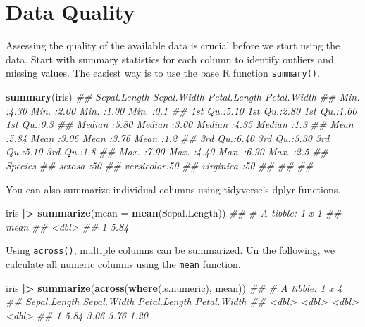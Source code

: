 \documentclass[
  notitlepage]{book}
\newenvironment{Shaded}{\begin{snugshade}}{\end{snugshade}}
\newcommand{\CommentTok}[1]{\textcolor[rgb]{0.56,0.35,0.01}{\textit{#1}}}
\newcommand{\DataTypeTok}[1]{\textcolor[rgb]{0.13,0.29,0.53}{#1}}
\newcommand{\ErrorTok}[1]{\textcolor[rgb]{0.64,0.00,0.00}{\textbf{#1}}}
\newcommand{\KeywordTok}[1]{\textcolor[rgb]{0.13,0.29,0.53}{\textbf{#1}}}
\newcommand{\NormalTok}[1]{#1}
\newcommand{\OperatorTok}[1]{\textcolor[rgb]{0.81,0.36,0.00}{\textbf{#1}}}
\newcommand{\StringTok}[1]{\textcolor[rgb]{0.31,0.60,0.02}{#1}}
\begin{document}
\hypertarget{data-quality}{%
\section{Data Quality}\label{data-quality}}

Assessing the quality of the available data is crucial before we start
using the data. Start with summary statistics for each column to
identify outliers and missing values. The easiest way is to use the base R
function \texttt{summary()}.

\begin{Shaded}
\begin{Highlighting}[]
\KeywordTok{summary}\NormalTok{(iris)}
\CommentTok{\#\#   Sepal.Length   Sepal.Width    Petal.Length   Petal.Width }
\CommentTok{\#\#  Min.   :4.30   Min.   :2.00   Min.   :1.00   Min.   :0.1  }
\CommentTok{\#\#  1st Qu.:5.10   1st Qu.:2.80   1st Qu.:1.60   1st Qu.:0.3  }
\CommentTok{\#\#  Median :5.80   Median :3.00   Median :4.35   Median :1.3  }
\CommentTok{\#\#  Mean   :5.84   Mean   :3.06   Mean   :3.76   Mean   :1.2  }
\CommentTok{\#\#  3rd Qu.:6.40   3rd Qu.:3.30   3rd Qu.:5.10   3rd Qu.:1.8  }
\CommentTok{\#\#  Max.   :7.90   Max.   :4.40   Max.   :6.90   Max.   :2.5  }
\CommentTok{\#\#        Species  }
\CommentTok{\#\#  setosa    :50  }
\CommentTok{\#\#  versicolor:50  }
\CommentTok{\#\#  virginica :50  }
\CommentTok{\#\#                 }
\CommentTok{\#\#                 }
\CommentTok{\#\# }
\end{Highlighting}
\end{Shaded}

You can also summarize
individual columns using tidyverse's dplyr functions.

\begin{Shaded}
\begin{Highlighting}[]
\NormalTok{iris }\OperatorTok{|}\ErrorTok{\textgreater{}}\StringTok{ }
\StringTok{  }\KeywordTok{summarize}\NormalTok{(}\DataTypeTok{mean =} \KeywordTok{mean}\NormalTok{(Sepal.Length))}
\CommentTok{\#\# \# A tibble: 1 x 1}
\CommentTok{\#\#    mean}
\CommentTok{\#\#   \textless{}dbl\textgreater{}}
\CommentTok{\#\# 1  5.84}
\end{Highlighting}
\end{Shaded}

Using \texttt{across()}, multiple columns can be summarized. Un the following,
we calculate all numeric columns using the \texttt{mean} function.

\begin{Shaded}
\begin{Highlighting}[]
\NormalTok{iris }\OperatorTok{|}\ErrorTok{\textgreater{}}\StringTok{ }
\StringTok{  }\KeywordTok{summarize}\NormalTok{(}\KeywordTok{across}\NormalTok{(}\KeywordTok{where}\NormalTok{(is.numeric), mean))}
\CommentTok{\#\# \# A tibble: 1 x 4}
\CommentTok{\#\#   Sepal.Length Sepal.Width Petal.Length Petal.Width}
\CommentTok{\#\#          \textless{}dbl\textgreater{}       \textless{}dbl\textgreater{}        \textless{}dbl\textgreater{}       \textless{}dbl\textgreater{}}
\CommentTok{\#\# 1         5.84        3.06         3.76        1.20}
\end{Highlighting}
\end{Shaded}
\end{document}

